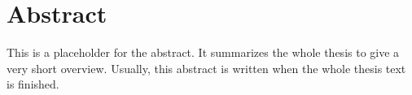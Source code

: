 

\chapter*{Abstract}
\label{cha:abstract}


This is a placeholder for the abstract. It summarizes the whole thesis
to give a very short overview. Usually, this abstract is written
when the whole thesis text is finished.



